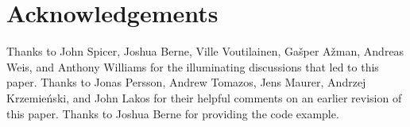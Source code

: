 
\section*{Acknowledgements}
Thanks to John Spicer,  Joshua Berne, Ville Voutilainen, Ga\v sper A\v zman, Andreas Weis, and Anthony Williams for the illuminating discussions that led to this paper. Thanks to Jonas Persson, Andrew Tomazos, Jens Maurer, Andrzej Krzemie\' nski, and John Lakos for their helpful comments on an earlier revision of this paper. Thanks to Joshua Berne for providing the  code example.


\renewcommand{\addcontentsline}[3]{}%






